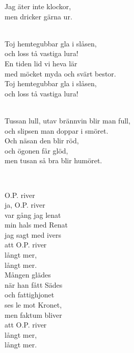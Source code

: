 \songtext{}Jag äter inte klockor, \\
men dricker gärna ur. \\


 \\       

\songtext{}
\leftrepeat Toj hemtegubbar gla i slåsen,\\
och loss tå vastiga lura! \rightrepeat \\
En tiden lid vi heva lär \\
med möcket myda och svärt bestor. \\
Toj hemtegubbar gla i slåsen, \\
och loss tå vastiga lura! \\


 \\       

\songtext{}
\leftrepeat Tussan lull, utav brännvin blir man full, \\
och slipsen man doppar i smöret. \rightrepeat \\
Och näsan den blir röd, \\
och ögonen får glöd, \\
men tusan så bra blir humöret.

\newpage 


 \\       

\songtext{}
O.P. river \\
ja, O.P. river \\
var gång jag lenat \\
min hals med Renat \\
jag sagt med ivers \\
att O.P. river \\
långt mer, \\
långt mer. \\
Mången glädes \\
när han fått Sädes \\
och fattighjonet \\
ses le mot Kronet, \\
men faktum bliver \\
att O.P. river \\
långt mer, \\
långt mer. \\

